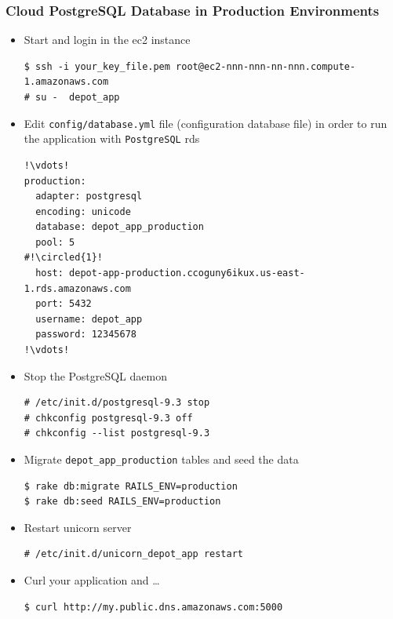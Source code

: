 \documentclass{beamer}
\newcommand*\circled[1]{\tikz[baseline=(char.base)]{
            \node[shape=circle,draw,inner sep=2pt] (char) {#1};}}
\begin{document}
\begin{frame}
\frametitle{Cloud PostgreSQL Database in Production Environments}
\begin{itemize}
\item Start and login in the \acrshort{ec2} instance

\lstset{language=shell, escapechar=!}
\begin{lstlisting}
$ ssh -i your_key_file.pem root@ec2-nnn-nnn-nn-nnn.compute-1.amazonaws.com
# su -  depot_app
\end{lstlisting}

\item Edit \texttt{config/database.yml} file (configuration database file) in order to run the application with \texttt{PostgreSQL} \acrshort{rds}

\lstset{language=Ruby, style=eclipse, numbers=left}
\begin{lstlisting}[escapechar=!]
!\vdots!
production:
  adapter: postgresql
  encoding: unicode
  database: depot_app_production
  pool: 5
#!\circled{1}!
  host: depot-app-production.ccoguny6ikux.us-east-1.rds.amazonaws.com
  port: 5432
  username: depot_app
  password: 12345678
!\vdots!
\end{lstlisting}

\item Stop the PostgreSQL daemon

\lstset{language=shell, escapechar=!}
\begin{lstlisting}[escapechar=!]
# /etc/init.d/postgresql-9.3 stop
# chkconfig postgresql-9.3 off
# chkconfig --list postgresql-9.3
\end{lstlisting}

\item Migrate \texttt{depot\_app\_production} tables and  seed the data

\lstset{language=shell}
\begin{lstlisting}[numbers=none, escapechar=!]
$ rake db:migrate RAILS_ENV=production
$ rake db:seed RAILS_ENV=production
\end{lstlisting}

\item Restart unicorn server
\lstset{language=shell, escapechar=!}
\begin{lstlisting}[escapechar=!]
# /etc/init.d/unicorn_depot_app restart
\end{lstlisting}

\item Curl your application and \dots 

\begin{lstlisting}[escapechar=!]
$ curl http://my.public.dns.amazonaws.com:5000
\end{lstlisting} 

 \end{itemize}
\end{frame}
\end{document}
